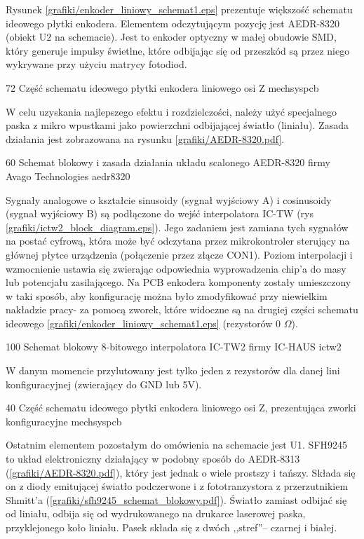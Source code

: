 Rysunek \ref{grafiki/enkoder_liniowy_schemat1.eps} prezentuje większość schematu ideowego płytki enkodera. Elementem odczytującym pozycję jest AEDR-8320 (obiekt U2 na schemacie). Jest to enkoder optyczny w małej obudowie SMD, który generuje impulsy świetlne, które odbijając się od przeszkód są przez niego wykrywane przy użyciu matrycy fotodiod.

	{72}
	{Część schematu ideowego płytki enkodera liniowego osi Z}
	{mechsyspcb}
	
W celu uzyskania najlepszego efektu i rozdzielczości, należy użyć specjalnego paska z mikro wpustkami jako powierzchni odbijającej światło (liniału). Zasada działania jest zobrazowana na rysunku \ref{grafiki/AEDR-8320.pdf}.

	{60}
	{Schemat blokowy i zasada działania układu scalonego AEDR-8320 firmy Avago Technologies}
	{aedr8320}
	
Sygnały analogowe o kształcie sinusoidy (sygnał wyjściowy A) i cosinusoidy (sygnał wyjściowy B) są podłączone do wejść interpolatora IC-TW (rys \ref{grafiki/ictw2_block_diagram.eps}). Jego zadaniem jest zamiana tych sygnałów na postać cyfrową, która może być odczytana przez mikrokontroler sterujący na głównej płytce urządzenia (połączenie przez złącze CON1). Poziom interpolacji i wzmocnienie ustawia się zwierając odpowiednia wyprowadzenia chip'a do masy lub potencjału zasilającego. Na PCB enkodera komponenty zostały umieszczony w taki sposób, aby konfigurację można było zmodyfikować przy niewielkim nakładzie pracy- za pomocą zworek, które widoczne są na drugiej części schematu ideowego \ref{grafiki/enkoder_liniowy_schemat1.eps} (rezystorów 0 $ \Omega $).

	{100}
	{Schemat blokowy 8-bitowego interpolatora IC-TW2 firmy IC-HAUS}
	{ictw2}
	
W danym momencie przylutowany jest tylko jeden z rezystorów dla danej lini konfiguracyjnej (zwierający do GND lub 5V). 

	{40}
	{Część schematu ideowego płytki enkodera liniowego osi Z, prezentująca zworki konfiguracyjne}
	{mechsyspcb}
	
Ostatnim elementem pozostałym do omówienia na schemacie jest U1. SFH9245 to układ elektroniczny działający w podobny sposób do AEDR-8313 (\ref{grafiki/AEDR-8320.pdf}), który jest jednak o wiele prostszy i tańszy. Składa się on z diody emitującej światło podczerwone i z fototranzystora z przerzutnikiem Shmitt'a (\ref{grafiki/sfh9245_schemat_blokowy.pdf}). Światło zamiast odbijać się od liniału, odbija się od wydrukowanego na drukarce laserowej paska, przyklejonego koło liniału. Pasek składa się z dwóch ,,stref''-- czarnej i białej.

